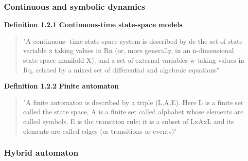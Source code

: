 \documentclass[12pt]{article}
\begin{document}
\subsubsection{Continuous and symbolic dynamics}

\textbf{Definition 1.2.1 Continuous-time state-space models}

\begin{quote}
"A continuous- time state-space system is described by de the set of state variable x taking values in Rn (or, more generally, in an n-dimensional state space manifold X), and a set of external variables w taking values in Rq, related by a mixed set of differential and algebraic equations"
\end{quote}


\textbf{Definition 1.2.2 Finite automaton}
\begin{quotation}
"A finite automaton is described by a triple (L,A,E). Here L is a finite set called the state space, A is a finite set called alphabet whose elements are called symbols. E is the transition rule; it is a subset of LxAxL and its elements are called edges (or transitions or events)"
\end{quotation}

\subsubsection{Hybrid automaton}
\end{document}
